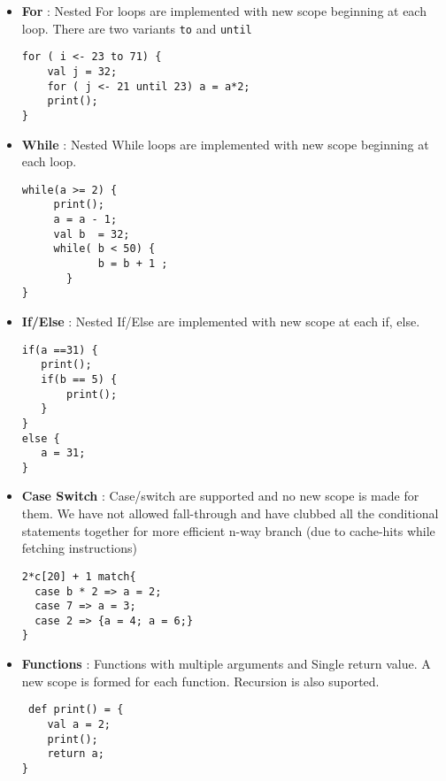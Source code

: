 \documentclass[11pt]{article}
\begin{document}
\begin{itemize}
\item \textbf{For} : Nested For loops are implemented with new scope beginning at each loop. There are two variants \texttt{to} and \texttt{until} 
\begin{verbatim}
for ( i <- 23 to 71) {
    val j = 32;
    for ( j <- 21 until 23) a = a*2;
    print();
}
\end{verbatim}
\end{itemize}


\begin{itemize}
\item \textbf{While} : Nested While loops are implemented with new scope beginning at each loop. 

\begin{verbatim}
while(a >= 2) {
     print();
     a = a - 1;
     val b  = 32;
     while( b < 50) {
            b = b + 1 ;
       }
}
\end{verbatim}
\end{itemize}


\begin{itemize}
\item \textbf{If/Else} : Nested If/Else are implemented with new scope at each if, else.

\begin{verbatim}
if(a ==31) {
   print();
   if(b == 5) {
       print();
   }
}
else {
   a = 31;
}
\end{verbatim}
\end{itemize}


\begin{itemize}
\item \textbf{Case Switch} : Case/switch are supported and no new scope is made for them. We 
have not allowed fall-through and have clubbed all the conditional statements together for more efficient n-way
branch (due to cache-hits while fetching instructions)

\begin{verbatim}
2*c[20] + 1 match{
  case b * 2 => a = 2;
  case 7 => a = 3;
  case 2 => {a = 4; a = 6;}
}
\end{verbatim}
\end{itemize}


\begin{itemize}
\item \textbf{Functions} : Functions with multiple arguments and Single return value. A new scope is formed for each function.
Recursion is also suported.
\begin{verbatim}
 def print() = {
    val a = 2;
    print();
    return a;
}
\end{verbatim}
\end{itemize}
\end{document}
